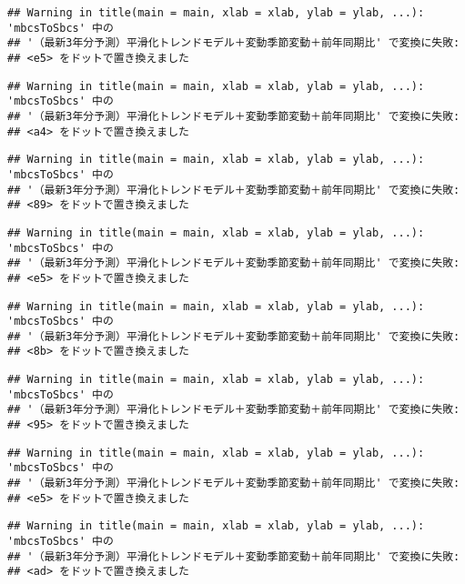 \documentclass[]{article}
\begin{document}
\begin{verbatim}
## Warning in title(main = main, xlab = xlab, ylab = ylab, ...): 'mbcsToSbcs' 中の
## '（最新3年分予測）平滑化トレンドモデル＋変動季節変動＋前年同期比' で変換に失敗:
## <e5> をドットで置き換えました
\end{verbatim}

\begin{verbatim}
## Warning in title(main = main, xlab = xlab, ylab = ylab, ...): 'mbcsToSbcs' 中の
## '（最新3年分予測）平滑化トレンドモデル＋変動季節変動＋前年同期比' で変換に失敗:
## <a4> をドットで置き換えました
\end{verbatim}

\begin{verbatim}
## Warning in title(main = main, xlab = xlab, ylab = ylab, ...): 'mbcsToSbcs' 中の
## '（最新3年分予測）平滑化トレンドモデル＋変動季節変動＋前年同期比' で変換に失敗:
## <89> をドットで置き換えました
\end{verbatim}

\begin{verbatim}
## Warning in title(main = main, xlab = xlab, ylab = ylab, ...): 'mbcsToSbcs' 中の
## '（最新3年分予測）平滑化トレンドモデル＋変動季節変動＋前年同期比' で変換に失敗:
## <e5> をドットで置き換えました
\end{verbatim}

\begin{verbatim}
## Warning in title(main = main, xlab = xlab, ylab = ylab, ...): 'mbcsToSbcs' 中の
## '（最新3年分予測）平滑化トレンドモデル＋変動季節変動＋前年同期比' で変換に失敗:
## <8b> をドットで置き換えました
\end{verbatim}

\begin{verbatim}
## Warning in title(main = main, xlab = xlab, ylab = ylab, ...): 'mbcsToSbcs' 中の
## '（最新3年分予測）平滑化トレンドモデル＋変動季節変動＋前年同期比' で変換に失敗:
## <95> をドットで置き換えました
\end{verbatim}

\begin{verbatim}
## Warning in title(main = main, xlab = xlab, ylab = ylab, ...): 'mbcsToSbcs' 中の
## '（最新3年分予測）平滑化トレンドモデル＋変動季節変動＋前年同期比' で変換に失敗:
## <e5> をドットで置き換えました
\end{verbatim}

\begin{verbatim}
## Warning in title(main = main, xlab = xlab, ylab = ylab, ...): 'mbcsToSbcs' 中の
## '（最新3年分予測）平滑化トレンドモデル＋変動季節変動＋前年同期比' で変換に失敗:
## <ad> をドットで置き換えました
\end{verbatim}
\end{document}
